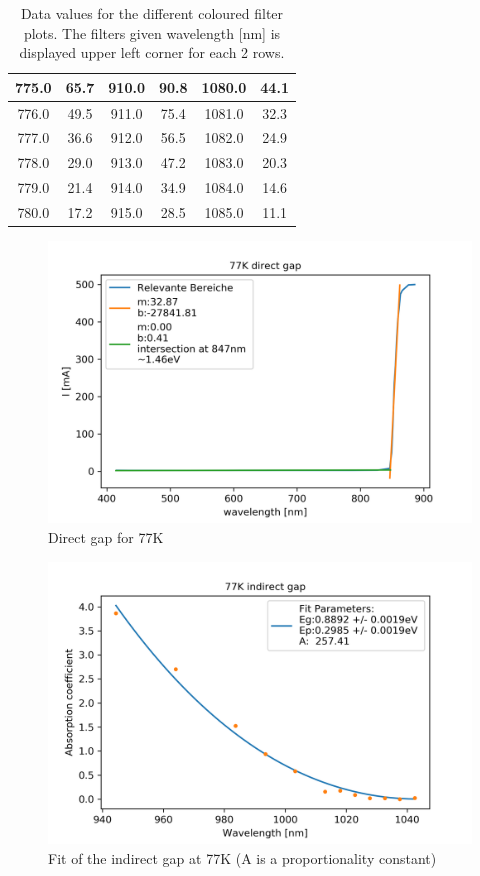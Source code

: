 \documentclass[]{article}
\begin{document}
\begin{table}[H]
\begin{tabular}{|c|c||c|c||c|c|}
775.0 & 65.7 & 910.0 & 90.8 & 1080.0 & 44.1 \\ \hline
776.0 & 49.5 & 911.0 & 75.4 & 1081.0 & 32.3 \\ \hline
777.0 & 36.6 & 912.0 & 56.5 & 1082.0 & 24.9 \\ \hline
778.0 & 29.0 & 913.0 & 47.2 & 1083.0 & 20.3 \\ \hline
779.0 & 21.4 & 914.0 & 34.9 & 1084.0 & 14.6 \\ \hline
780.0 & 17.2 & 915.0 & 28.5 & 1085.0 & 11.1 \\ \hline
\hline
\end{tabular}
\caption{Data values for the different coloured filter plots. The filters given wavelength [nm] is displayed upper left corner for each 2 rows. }
\end{table}
\begin{figure}
	\centering
	\includegraphics[width=0.7\linewidth]{"Plots/77k direct gap"}
	\caption{Direct gap for 77K}
	\label{fig:77k-direct-gap}
\end{figure}
\begin{figure}
	\centering
	\includegraphics[width=0.7\linewidth]{"Plots/77K indirect gap"}
	\caption{Fit of the indirect gap at 77K (A is a proportionality constant)}
	\label{fig:77k-indirect-gap}
\end{figure}
\end{document}
